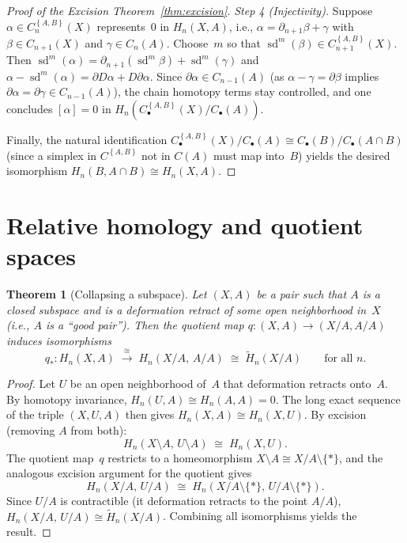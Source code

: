 \documentclass[12pt,a4paper,openany]{book}
\theoremstyle{definition}
\theoremstyle{plain}
\newtheorem{theorem}[definition]{Theorem}
\theoremstyle{remark}
\newcommand{\set}[1]{\left\{#1\right\}}
\begin{document}
\begin{proof}[Proof of the Excision Theorem~\ref{thm:excision}]
\medskip\noindent
\textit{Step 4 (Injectivity).}
Suppose $\alpha\in C_n^{\set{A,B}}(X)$ represents~$0$ in $H_n(X,A)$,
i.e., $\alpha=\partial_{n+1}\beta+\gamma$ with $\beta\in C_{n+1}(X)$
and $\gamma\in C_n(A)$.  Choose~$m$ so that $\operatorname{sd}^m(\beta)\in
C_{n+1}^{\set{A,B}}(X)$.  Then
$\operatorname{sd}^m(\alpha)=\partial_{n+1}(\operatorname{sd}^m\beta)+\operatorname{sd}^m(\gamma)$
and $\alpha-\operatorname{sd}^m(\alpha)=\partial D\alpha+D\partial\alpha$.
Since $\partial\alpha\in C_{n-1}(A)$ (as $\alpha-\gamma=\partial\beta$
implies $\partial\alpha=\partial\gamma\in C_{n-1}(A)$), the chain homotopy
terms stay controlled, and one concludes $[\alpha]=0$
in $H_n(C_\bullet^{\set{A,B}}(X)/C_\bullet(A))$.

\medskip
Finally, the natural identification
$C_\bullet^{\set{A,B}}(X)/C_\bullet(A)\cong C_\bullet(B)/C_\bullet(A\cap B)$
(since a simplex in $C^{\set{A,B}}$ not in $C(A)$ must map into~$B$)
yields the desired isomorphism $H_n(B,A\cap B)\cong H_n(X,A)$.
\end{proof}

\section{Relative homology and quotient spaces}\label{sec:relative-quotient}

\begin{theorem}[Collapsing a subspace]\label{thm:relative-quotient}
Let $(X,A)$ be a pair such that $A$ is a closed subspace and is a
deformation retract of some open neighborhood in~$X$ (i.e., $A$ is a
``good pair'').  Then the quotient map
$q\colon(X,A)\to(X/A,A/A)$ induces isomorphisms
\[
  q_*\colon H_n(X,A)\;\xrightarrow{\;\cong\;}\;
  H_n(X/A,\,A/A)\;\cong\;\widetilde{H}_n(X/A)
  \qquad\text{for all } n.
\]
\end{theorem}

\begin{proof}
Let $U$ be an open neighborhood of~$A$ that deformation retracts onto~$A$.
By homotopy invariance, $H_n(U,A)\cong H_n(A,A)=0$.  The long exact
sequence of the triple $(X,U,A)$ then gives $H_n(X,A)\cong H_n(X,U)$.
By excision (removing $A$ from both):
\[
  H_n(X\setminus A,\,U\setminus A)\;\cong\; H_n(X,U).
\]
The quotient map~$q$ restricts to a homeomorphism
$X\setminus A\cong X/A\setminus\{*\}$, and the analogous excision argument
for the quotient gives
\[
  H_n(X/A,\,U/A)\;\cong\; H_n(X/A\setminus\{*\},\,U/A\setminus\{*\}).
\]
Since $U/A$ is contractible (it deformation retracts to the point $A/A$),
$H_n(X/A,\,U/A)\cong\widetilde{H}_n(X/A)$.  Combining all isomorphisms
yields the result.
\end{proof}
\end{document}
